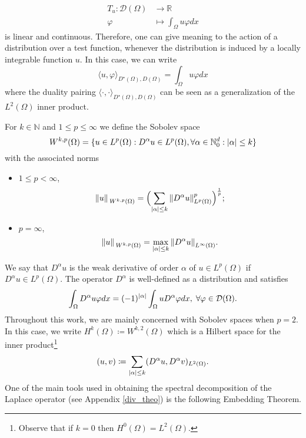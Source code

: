 \begin{align*}
    T_u: \mathcal{D}(\Omega) &\rightarrow \mathbb{R}\\
    \varphi &\mapsto \int_\Omega u \varphi dx
\end{align*}
is linear and continuous. Therefore, one can give meaning to the action of a distribution over a test function, whenever the distribution is induced by a locally integrable function \(u\). In this case, we can write
\[
    \langle u, \varphi \rangle_{D^\star(\Omega), D(\Omega)} = \int_\Omega u \varphi dx
\]
where the duality pairing \( \langle \cdot , \cdot \rangle_{D^\star(\Omega), D(\Omega)}\) can be seen as a generalization of the \(L^2(\Omega)\) inner product.

\begin{definition}
    For \(k \in \mathbb{N}\) and \(1 \leq p \leq \infty\) we define the Sobolev space
    \[
    W^{k,p}(\Omega) = \{u \in L^p(\Omega): D^\alpha u \in L^p(\Omega), \forall \alpha \in \mathbb{N}_0^d: \abs{\alpha} \leq k\}
    \]
    with the associated norms
    \begin{itemize}
        \item \(1 \leq p < \infty\),
            \[
            \norm*{u}_{W^{k,p}(\Omega)} = \Bigl(\sum_{\abs{\alpha} \leq k} \norm{D^\alpha u}_{L^p(\Omega)}^p\Bigr)^{\frac{1}{p}};
            \]
            \item \(p = \infty\),
            \[
            \norm*{u}_{W^{k,p}(\Omega)} = \max_{\abs{\alpha} \leq k} \norm{D^\alpha u}_{L^\infty(\Omega)}.
            \]
    \end{itemize}

\end{definition}
We say that \(D^\alpha u\) is the weak derivative of order \(\alpha\) of \(u \in L^p(\Omega)\) if \(D^\alpha u \in L^p(\Omega)\). The operator \(D^\alpha\) is well-defined as a distribution and satisfies
\[
    \int_\Omega D^\alpha u \varphi dx = (-1)^\abs{\alpha} \int_\Omega u D^\alpha \varphi dx, \; \forall \varphi \in \mathcal{D}(\Omega).
\] 
Throughout this work, we are mainly concerned with Sobolev spaces when \(p=2\). In this case, we write \(H^k(\Omega) \coloneqq W^{k, 2}(\Omega)\) which is a Hilbert space for the inner product\footnote{Observe that if \(k=0\) then \(H^0(\Omega) = L^2(\Omega)\).}
\[
 (u, v) \coloneqq \sum_{\abs{\alpha} \leq k} (D^\alpha u, D^\alpha v)_{L^2(\Omega)}.
\]
One of the main tools used in obtaining the spectral decomposition of the Laplace operator (see Appendix \ref{div_theo}) is the following Embedding Theorem.

